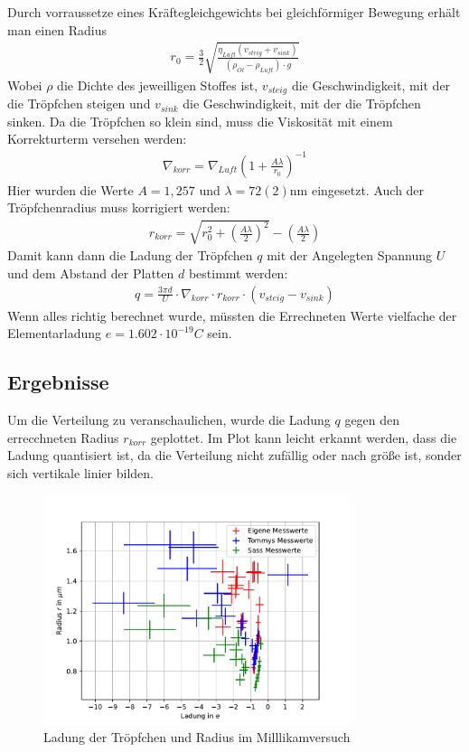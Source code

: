 \documentclass[11pt, a4paper]{article}
\begin{document}
    Durch vorraussetze eines Kräftegleichgewichts bei gleichförmiger Bewegung erhält man einen Radius
    \begin{align}
        r_0 = \frac{3}{2} \sqrt{\frac{\eta_{Luft} (v_{steig} + v_{sink})}{(\rho_{\ddot{Ol}} - \rho_{Luft}) \cdot g}}%
    \end{align}
    Wobei $\rho$ die Dichte des jeweilligen Stoffes ist, $v_{steig}$ die Geschwindigkeit, mit der die Tröpfchen steigen und $v_{sink}$ die Geschwindigkeit, mit der die Tröpfchen sinken. Da die Tröpfchen so klein sind, muss die Viskosität mit einem Korrekturterm versehen werden:
    \begin{align}
        \nabla_{korr} = \nabla_{Luft}(1+\frac{A \lambda}{r_0})^{-1}
    \end{align}
    Hier wurden die Werte $A = 1,257$ und $\lambda = 72(2) \si{\nano\metre}$ eingesetzt.
    Auch der Tröpfchenradius muss korrigiert werden:
    \begin{align}
        r_{korr} = \sqrt{r_0^2 + \left(\frac{A \lambda}{2}\right)^2} - \left(\frac{A \lambda}{2}\right)
    \end{align}
    Damit kann dann die Ladung der Tröpfchen $q$ mit der Angelegten Spannung $U$ und dem Abstand der Platten $d$ bestimmt werden:
    \begin{align}
        q = \frac{3 \pi d}{U} \cdot \nabla_{korr} \cdot r_{korr} \cdot \left(v_{steig} - v_{sink}\right)
    \end{align}
    Wenn alles richtig berechnet wurde, müssten die Errechneten Werte vielfache der Elementarladung $e = 1.602 \cdot 10^{-19} \si{C}$ sein.

    \subsection{Ergebnisse}
    Um die Verteilung zu veranschaulichen, wurde die Ladung $q$ gegen den errecchneten Radius $r_{korr}$ geplottet. Im Plot kann leicht erkannt werden, dass die Ladung quantisiert ist, da die Verteilung nicht zufällig oder nach größe ist, sonder sich vertikale linier bilden.
    \begin{figure}[h]
        \centering
        \includegraphics[width=0.8\textwidth]{millikan.pdf}
        \caption{Ladung der Tröpfchen und Radius im Milllikamversuch}
        \label{fig:milllikam}
    \end{figure}
\end{document}
